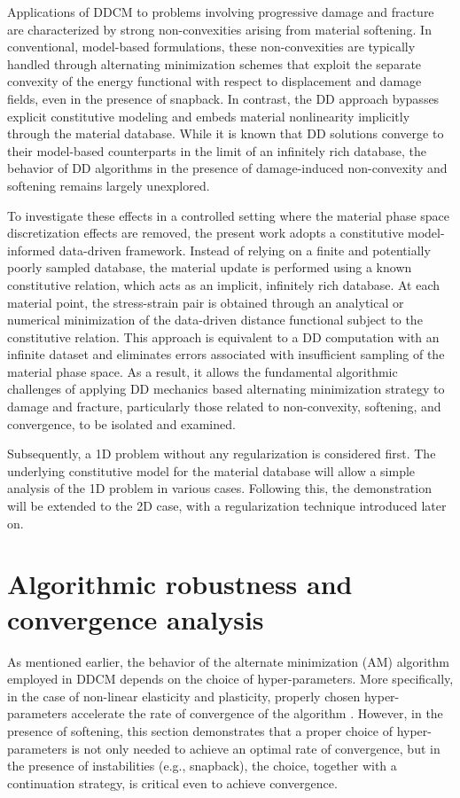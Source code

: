 \documentclass[10pt,review]{cas-sc}
\begin{document}
Applications of DDCM to problems involving progressive damage and fracture are characterized by strong non-convexities arising from material softening. In conventional, model-based formulations, these non-convexities are typically handled through alternating minimization schemes that exploit the separate convexity of the energy functional with respect to displacement and damage fields, even in the presence of snapback. In contrast, the DD approach bypasses explicit constitutive modeling and embeds material nonlinearity implicitly through the material database. While it is known that DD solutions converge to their model-based counterparts in the limit of an infinitely rich database, the behavior of DD algorithms in the presence of damage-induced non-convexity and softening remains largely unexplored.

To investigate these effects in a controlled setting where the material phase space discretization effects are removed, the present work adopts a constitutive model-informed data-driven framework. Instead of relying on a finite and potentially poorly sampled database, the material update is performed using a known constitutive relation, which acts as an implicit, infinitely rich database. At each material point, the stress-strain pair is obtained through an analytical or numerical minimization of the data-driven distance functional subject to the constitutive relation. This approach is equivalent to a DD computation with an infinite dataset and eliminates errors associated with insufficient sampling of the material phase space. As a result, it allows the fundamental algorithmic challenges of applying DD mechanics based alternating minimization strategy to damage and fracture, particularly those related to non-convexity, softening, and convergence, to be isolated and examined.

Subsequently, a 1D problem without any regularization is considered first. The underlying constitutive model for the material database will allow a simple analysis of the 1D problem in various cases. Following this, the demonstration will be extended to the 2D case, with a regularization technique introduced later on. 

\section{Algorithmic robustness and convergence analysis}


As mentioned earlier, the behavior of the alternate minimization (AM) algorithm employed in DDCM depends on the choice of hyper-parameters. More specifically, in the case of non-linear elasticity and plasticity, properly chosen hyper-parameters accelerate the rate of convergence of the algorithm \cite{Nguyen2022,Pham2023}. However, in the presence of softening, this section demonstrates that a proper choice of hyper-parameters is not only needed to achieve an optimal rate of convergence, but in the presence of instabilities (e.g., snapback), the choice, together with a continuation strategy, is critical even to achieve convergence.
\end{document}
